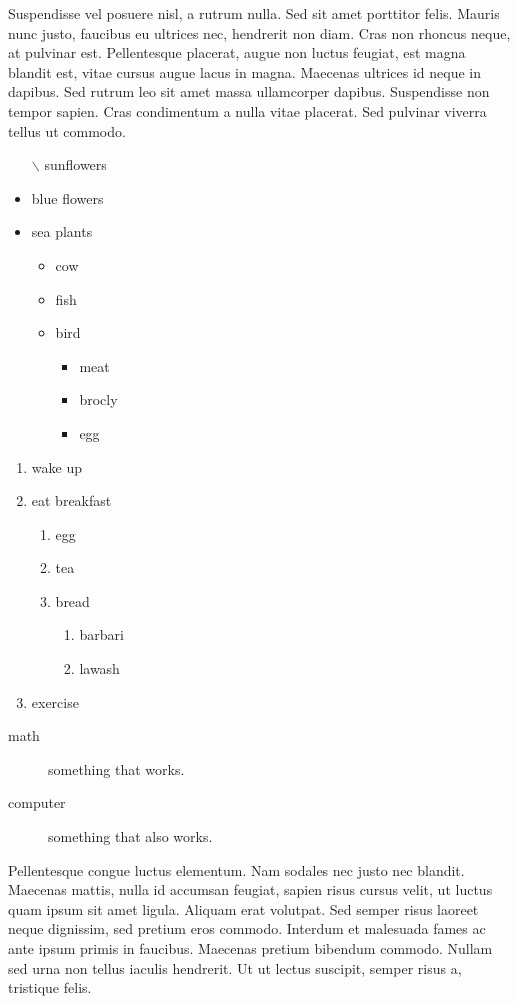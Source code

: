\documentclass[a4paper, 12pt]{article}
\begin{document}
	Suspendisse vel posuere nisl, a rutrum nulla. Sed sit amet porttitor felis. Mauris nunc justo, faucibus eu ultrices nec, hendrerit non diam. Cras non rhoncus neque, at pulvinar est. Pellentesque placerat, augue non luctus feugiat, est magna blandit est, vitae cursus augue lacus in magna. Maecenas ultrices id neque in dapibus. Sed rutrum leo sit amet massa ullamcorper dapibus. Suspendisse non tempor sapien. Cras condimentum a nulla vitae placerat. Sed pulvinar viverra tellus ut commodo.
	\begin{itemize}
		\item[$\backslash$] sunflowers
		\item blue flowers
		\item sea plants
		\begin{itemize}
			\item cow
			\item fish
			\item bird
			\begin{itemize}
				\item meat
				\item brocly
				\item egg
			\end{itemize}
		\end{itemize}
	\end{itemize}

	\begin{enumerate}
		\item wake up
		\item eat breakfast
		\begin{enumerate}
			\item egg
			\item tea
			\item bread
			\begin{enumerate}
				\item barbari
				\item lawash
			\end{enumerate}
		\end{enumerate}
		\item exercise
	\end{enumerate}

	\begin{description}
		\item[math] something that works.
		\item[computer] something that also works.
	\end{description}
	
	Pellentesque congue luctus elementum. Nam sodales nec justo nec blandit. Maecenas mattis, nulla id accumsan feugiat, sapien risus cursus velit, ut luctus quam ipsum sit amet ligula. Aliquam erat volutpat. Sed semper risus laoreet neque dignissim, sed pretium eros commodo. Interdum et malesuada fames ac ante ipsum primis in faucibus. Maecenas pretium bibendum commodo. Nullam sed urna non tellus iaculis hendrerit. Ut ut lectus suscipit, semper risus a, tristique felis.
	
\end{document}
